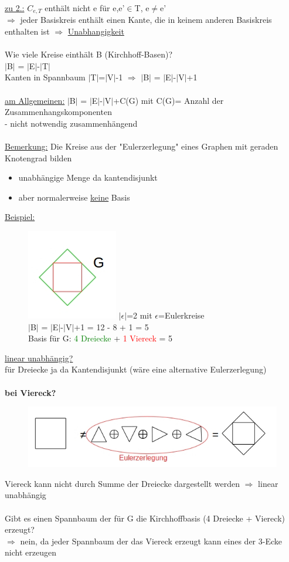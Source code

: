 \underline{zu 2.:} $C_{e,T}$ enthält nicht e für e,e'$\in$T, e$\neq$e'\\
$\Rightarrow$ jeder Basiskreis enthält einen Kante, die in keinem anderen Basiskreis enthalten ist $\Rightarrow$ \underline{Unabhangigkeit}
\\\\
Wie viele Kreise einthält B (Kirchhoff-Basen)?\\
$|$B$|$ = $|$E$|$-$|$T$|$\\
Kanten in Spannbaum $|$T$|$=$|$V$|$-1 $\Rightarrow$ $|$B$|$ = $|$E$|$-$|$V$|$+1
\\\\
\underline{am Allgemeinen:} $|$B$|$ = $|$E$|$-$|$V$|$+C(G) mit C(G)= Anzahl der Zusammenhangskomponenten\\
 - nicht notwendig zusammenhängend
\\\\
\underline{Bemerkung:} Die Kreise aus der "Eulerzerlegung" eines Graphen mit geraden Knotengrad bilden
\begin{itemize}
	\item unabhängige Menge da kantendisjunkt
	\item aber normalerweise \underline{keine} Basis
\end{itemize}

\newpage
\underline{Beispiel:}
\begin{figure}[htp]
\centering
\includegraphics[scale=1.00]{lectures/161104/pix/pic7.jpg}
$| \epsilon |$=2 mit $\epsilon$=Eulerkreise\\
$|$B$|$ = $|$E$|$-$|$V$|$+1 = 12 - 8 + 1 = 5\\
Basis für G: \textcolor{green}{4 Dreiecke} + \textcolor{red}{1 Viereck} = 5
\end{figure}

\underline{linear unabhängig?}\\
für Dreiecke ja da Kantendisjunkt (wäre eine alternative Eulerzerlegung)
\\\\
\textbf{bei Viereck?}\\
\begin{figure}[htp]
\centering
\includegraphics[scale=1.00]{lectures/161104/pix/pic8.jpg}
\end{figure}

Viereck kann nicht durch Summe der Dreiecke dargestellt werden $\Rightarrow$ linear unabhängig
\\\\
Gibt es einen Spannbaum der für G die Kirchhoffbasis (4 Dreiecke + Viereck) erzeugt?\\
$\Rightarrow$ nein, da jeder Spannbaum der das Viereck erzeugt kann eines der 3-Ecke nicht erzeugen